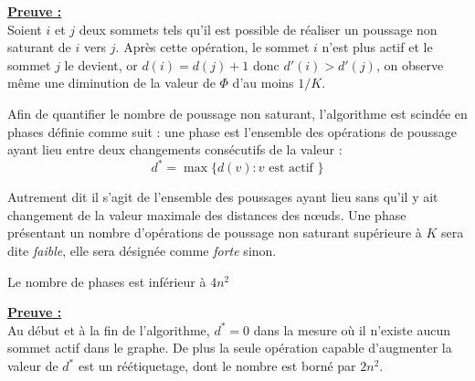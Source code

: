 \underline{\textbf{Preuve :}}\\
Soient $i$ et $j$ deux sommets tels qu'il est possible de réaliser un poussage non saturant de $i$
vers $j$.  Après cette opération, le sommet $i$ n'est plus actif et le sommet $j$ le devient, or
$d(i) = d(j) + 1$ donc $d'(i) > d'(j)$, on observe même une diminution de la valeur de $\Phi$ d'au
moins $1/K$.

Afin de quantifier le nombre de poussage non saturant, l'algorithme est scindée en phases définie
comme suit : une phase est l'ensemble des opérations de poussage ayant lieu entre deux changements
consécutifs de la valeur :
\begin{equation}
	d^* = \max\{d(v) : v \mbox{ est actif }\}
\end{equation}

Autrement dit il s'agit de l'ensemble des poussages ayant lieu sans qu'il y ait changement de la
valeur maximale des distances des n\oe uds.
Une phase présentant un nombre d'opérations de poussage non saturant supérieure à $K$ sera dite
\emph{faible}, elle sera désignée comme \emph{forte} sinon.

\begin{lemma}
	Le nombre de phases est inférieur à $4n^2$
\end{lemma}

\underline{\textbf{Preuve :}}\\
Au début et à la fin de l'algorithme, $d^* = 0$ dans la mesure où il n'existe aucun sommet actif
dans le graphe. De plus la seule opération capable d'augmenter la valeur de $d^*$ est un
réétiquetage, dont le nombre est borné par $2n^2$.
